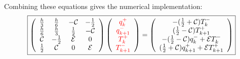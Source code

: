 Combining these equations gives the numerical implementation:
\begin{eqnarray}
\boxed{
\left(
\begin{array}{cccc}
\frac{h}{3}    &  \frac{h}{6} & -{\cal C}   &-\frac{1}{2} \\
\frac{h}{6}    &  \frac{h}{3} & \frac{1}{2} & -{\cal C} \\
{\cal C}    & -\frac{1}{2} & {\cal E} & 0\\
\frac{1}{2} & {\cal C} & 0 & {\cal E}
\end{array}
\right) \left(
\begin{array}{c}
     \color{red}{q_k^+}  \\
     \color{red}{q_{k+1}^-} \\
     \color{red}{T_k^+} \\
     \color{red}{T_{k+1}^-}
\end{array}
\right)=\left(
\begin{array}{c}
     -(\frac{1}{2}+{\cal{C}}) T_k^-  \\
      (\frac{1}{2}-{\cal{C}}) T_{k+1}^+ \\
     -(\frac{1}{2}-{\cal{C}})q_k^-+{\cal{E}} T_k^-  \\
      (\frac{1}{2}+{\cal{C}})q_{k+1}^++{\cal{E}} T_{k+1}^+
\end{array}
\right)
}  \label{eq:dgsyst1D}
\end{eqnarray}

